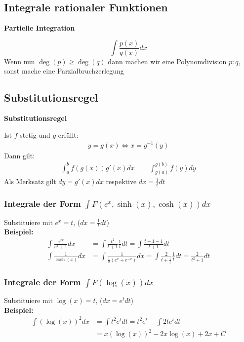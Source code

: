 \documentclass[25pt]{sciposter}
\newenvironment{method}[1]{\begin{mdframed}[backgroundcolor=blue!10,innertopmargin=15pt, innerbottommargin=15pt,nobreak=true]
		\textbf{#1 }
	}
	{ 
	\end{mdframed}
}
\begin{document}
\begin{multicols}{3}
		
		
		\subsection*{Integrale rationaler Funktionen}
		\begin{method}{Partielle Integration}
			$$\int \frac{p(x)}{q(x)} dx$$
			Wenn nun $\deg(p) \geq \deg(q)$ dann machen wir eine Polynomdivision $p:q$, sonst mache eine Parzialbruchzerlegung
		\end{method}
		
		\subsection*{Substitutionsregel}
		\begin{method}{Substitutionsregel}
			Ist $f$ stetig und $g$ erfüllt:
			\begin{align*}
				y = g(x) \iff x = g^{-1}(y)
			\end{align*}
			Dann gilt:
			\begin{align*}
				\int_a ^b f(g(x))g'(x) dx &= \int_{g(a)}^{g(b)} f(y) dy
			\end{align*}
			Als Merksatz gilt $dy = g'(x) dx$ respektive $dx = \frac{1}{t} dt$
		\end{method}
		
		\subsubsection*{Integrale der Form $\int F(e^x, \sinh(x), \cosh(x)) dx$}
		Substituiere mit $e^x = t$, ($dx = \frac{1}{t} dt$)\\
		\textbf{Beispiel:}
		\begin{align*}
			\int \frac{e^{2x}}{e^x + 1} dx &= \int \frac{t^2}{t + 1 } \frac{1}{t} dt = \int\frac{t +1 - 1}{t+1} dt\\
			\int \frac{1}{\cosh(x)} dx &= \int \frac{1}{\frac{1}{2} (e^x + e^{-x})} dx = \int \frac{2}{t + \frac{1}{t}} \frac{1}{t} dt = \frac{2}{t^2 + 1} dt
		\end{align*}
		
		\subsubsection*{Integrale der Form $\int F(\log(x)) dx$}
		Substituiere mit $\log(x) = t$, ($dx = e^t dt$)\\
		\textbf{Beispiel:}
		\begin{align*}
			\int (\log(x))^2 dx &= \int t^2 e^t dt = t^2 e^t - \int 2t e^t dt  \\
			&= x(\log(x))^2 -2x\log(x) + 2x + C
		\end{align*}
		

\end{multicols}
\end{document}

